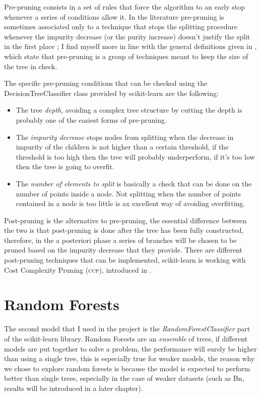 \medskip

Pre-pruning consists in a set of rules that force the algorithm to an early stop whenever a series
of conditions allow it. In the literature pre-pruning is sometimes associated only to a technique
that stops the splitting procedure whenever the impurity decrease (or the purity increase) doesn't
justify the split in the first place \cite{ZhouZhi-Hua2021ML}; I find myself more in line with
the general definitions given in \cite{bramer2007principles}\cite{fisher1996learning}, which
state that pre-pruning is a group of techniques meant to keep the size of the tree in check.

The specific pre-pruning conditions that can be checked using the DecisionTreeClassifier class provided by
scikit-learn are the following:
\begin{itemize}
	\item The tree \emph{depth}, avoiding a complex tree structure by cutting the depth is
	      probably one of the easiest forms of pre-pruning.
	\item The \emph{impurity decrease} stops nodes from splitting when the decrease in impurity
	      of the children is not higher than a certain threshold, if the threshold is too high
	      then the tree will probably underperform, if it's too low then the tree is going to
	      overfit.
	\item The \emph{number of elements to split} is basically a check that can be done on the
	      number of points inside a node. Not splitting when the number of points
	      contained in a node is too little is ax excellent way of avoiding overfitting.
\end{itemize}

\medskip

Post-pruning is the alternative to pre-pruning, the essential difference between the two is that
post-pruning is done after the tree has been fully constructed, therefore, in the a posteriori phase
a series of branches will be chosen to be pruned based on the impurity decrease that they provide.
There are different post-pruning techniques that can be implemented, scikit-learn is working with
Cost Complexity Pruning (\textsc{ccp}), introduced in \cite{breiman1984classification}.

\section{Random Forests}
\label{sec:rf}
The second model that I used in the project is the \emph{RandomForestClassifier} part of the scikit-learn
library. Random Forests are an \emph{ensemble} of trees, if different models are put together to solve a
problem, the performance will surely be higher than using a single tree, this is especially true for
weaker models, the reason why we chose to explore random forests is because the model is expected to
perform better than single trees, especially in the case of weaker datasets (such as Bn, results
will be introduced in a later chapter).

